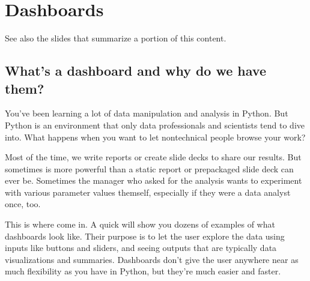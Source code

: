 \documentclass[letterpaper,10pt,english]{jupyterBook}
\begin{document}
\chapter{Dashboards}
\label{\detokenize{chapter-14-dashboards:dashboards}}\label{\detokenize{chapter-14-dashboards::doc}}
\sphinxAtStartPar
See also the slides that summarize a portion of this content.


\section{What’s a dashboard and why do we have them?}
\label{\detokenize{chapter-14-dashboards:what-s-a-dashboard-and-why-do-we-have-them}}
\sphinxAtStartPar
You’ve been learning a lot of data manipulation and analysis in Python.  But Python is an environment that only data professionals and scientists tend to dive into.  What happens when you want to let non\sphinxhyphen{}technical people browse your work?

\sphinxAtStartPar
Most of the time, we write reports or create slide decks to share our results.  But sometimes  is more powerful than a static report or pre\sphinxhyphen{}packaged slide deck can ever be.  Sometimes the manager who asked for the analysis wants to experiment with various parameter values themself, especially if they were a data analyst once, too.

\sphinxAtStartPar
This is where  come in.  A quick  will show you dozens of examples of what dashboards look like.  Their purpose is to let the user explore the data using inputs like buttons and sliders, and seeing outputs that are typically data visualizations and summaries.  Dashboards don’t give the user anywhere near as much flexibility as you have in Python, but they’re much easier and faster.
\end{document}
